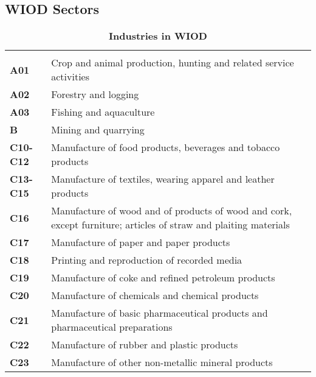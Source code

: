 \documentclass[11pt,a4paper]{article}
\begin{document}



\newpage


\newpage
\appendix

\begin{appendices}
\section{WIOD Sectors}
\begin{table}[!h]
 \centering
 \caption{\footnotesize{\textbf{Industries in WIOD}}}
 \footnotesize
 \begin{tabular}{ll}
  \hline \\
\textbf{A01} &{Crop and animal production, hunting and related service activities}\\
\textbf{A02} &{Forestry and logging}\\
\textbf{A03} &{Fishing and aquaculture}\\
\textbf{B} &{Mining and quarrying}\\
\textbf{C10-C12} &{Manufacture of food products, beverages and tobacco products}\\
\textbf{C13-C15} &{Manufacture of textiles, wearing apparel and leather products}\\
\textbf{C16} &{Manufacture of wood and of products of wood and cork, except furniture; articles of straw and plaiting materials}\\
\textbf{C17} &{Manufacture of paper and paper products}\\
\textbf{C18} &{Printing and reproduction of recorded media}\\
\textbf{C19} &{Manufacture of coke and refined petroleum products}\\
\textbf{C20} &{Manufacture of chemicals and chemical products}\\
\textbf{C21} &{Manufacture of basic pharmaceutical products and pharmaceutical preparations}\\
\textbf{C22} &{Manufacture of rubber and plastic products}\\
\textbf{C23} &{Manufacture of other non-metallic mineral products}\\

\end{tabular}
\end{table}
\end{appendices}
\end{document}

